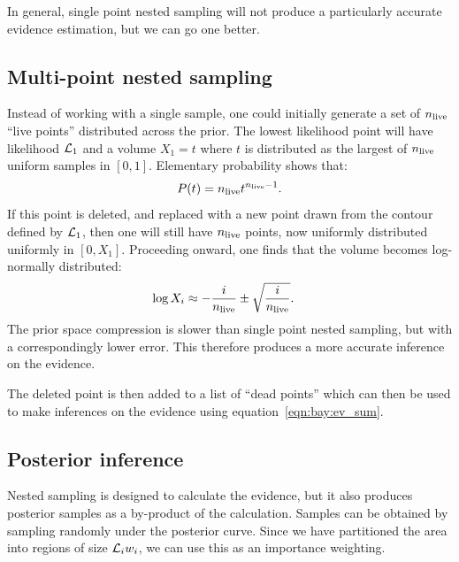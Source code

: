 In general, single point nested sampling will not produce a particularly accurate evidence estimation, but we can go one better.


\subsection{Multi-point nested sampling}
Instead of working with a single sample, one could initially generate a set of $n_{\mathrm{live}}$ ``live points'' distributed across the prior. The lowest likelihood point will have likelihood $\mathcal{L}_1$ and a volume $X_1 = t$ where $t$ is distributed as the largest of $n_{\mathrm{live}}$ uniform samples in $[0,1]$. Elementary probability shows that:
\begin{equation}
  P(t) = n_{\mathrm{live}} t^{n_{\mathrm{live}}-1}.
  \label{eqn:bay:t_prob}
\end{equation}
If this point is deleted, and replaced with a new point drawn from the contour defined by $\mathcal{L}_1$, then one will still have $n_{\mathrm{live}}$ points, now uniformly distributed uniformly in $[0,X_1]$. Proceeding onward, one finds that the volume becomes log-normally distributed:
\begin{align}
  \log X_i  &\approx -\frac{i}{n_{\mathrm{live}}} \pm \sqrt{\frac{i}{n_{\mathrm{live}}}}.
  \label{eqn:pc:X_full}
\end{align}
The prior space compression is slower than single point nested sampling, but with a correspondingly lower error. This therefore produces a more accurate inference on the evidence.

The deleted point is then added to a list of ``dead points'' which can then be used to make inferences on the evidence using equation~\eqref{eqn:bay:ev_sum}.


\subsection{Posterior inference}
Nested sampling is designed to calculate the evidence, but it also produces posterior samples as a by-product of the calculation. Samples can be obtained by sampling randomly under the posterior curve.%
Since we have partitioned the area into regions of size $\mathcal{L}_i w_i$, we can use this as an importance weighting.


